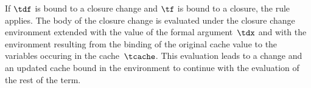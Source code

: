 If $\tdf$ is bound to a closure change and $\tf$ is bound to a
closure, the rule~ applies. The body of the
closure change is evaluated under the closure change environment
extended with the value of the formal argument~$\tdx$ and with the
environment resulting from the binding of the original cache value
to the variables occuring in the cache~$\tcache$. This evaluation
leads to a change and an updated cache bound in the environment
to continue with the evaluation of the rest of the term.




